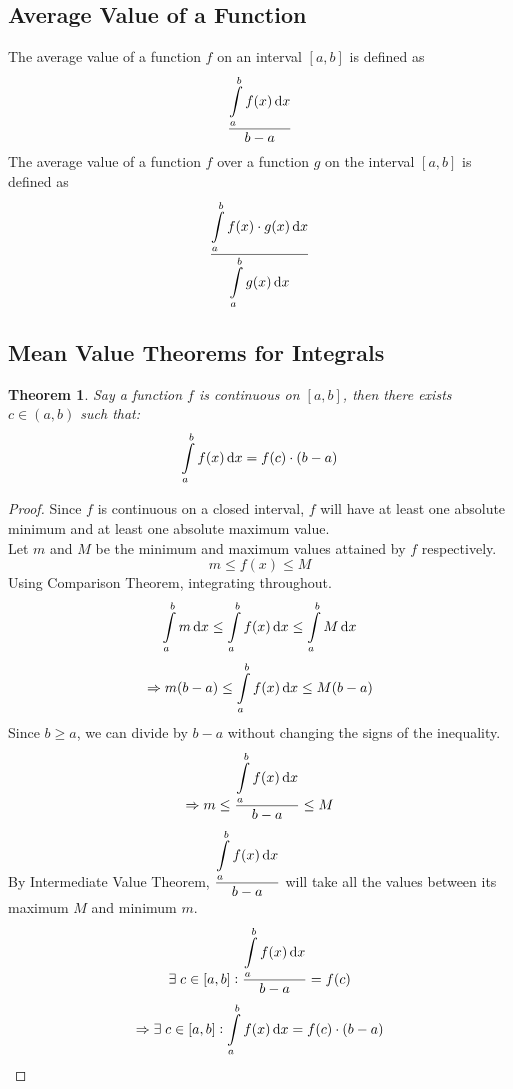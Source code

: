 \documentclass[14]{article}
\newtheorem{theorem}{Theorem}
\theoremstyle{definition}
\theoremstyle{case}
\begin{document}
\subsection{Average Value of a Function}
The average value of a function $f$ on an interval $[a, b]$ is defined as
\[\dfrac{\displaystyle\int\limits_a^b f(x) \dif x}{b-a}\]
The average value of a function $f$ over a function $g$ on the interval $[a, b]$ is defined as
\[\dfrac{\displaystyle\int\limits_a^b f(x)\cdot g(x) \dif x}{\displaystyle \int\limits_a^b g(x) \dif x}\]
\pagebreak
\subsection{Mean Value Theorems for Integrals}
\begin{theorem}
Say a function $f$ is continuous on $[a, b]$, then there exists $c \in (a, b)$ such that:
\[\int\limits_a^b f(x) \dif x = f(c) \cdot (b-a)\]
\end{theorem}
\begin{proof}
Since $f$ is continuous on a closed interval, $f$ will have at least one absolute minimum and at least one absolute maximum value.\\
Let $m$ and $M$ be the minimum and maximum values attained by $f$ respectively.
\[m \leq f(x) \leq M\]
Using Comparison Theorem, integrating throughout.
\[\int\limits_a^b m \dif x \leq \int\limits_a^b f(x) \dif x \leq \int\limits_a^b M \dif x\]
\[\Rightarrow m(b-a) \leq \int\limits_a^b f(x) \dif x \leq M(b-a)\]
Since $b \geq a$, we can divide by $b-a$ without changing the signs of the inequality.
\[\Rightarrow m \leq \dfrac{\displaystyle\int\limits_a^b f(x)\dif x}{b-a} \leq M\]
By Intermediate Value Theorem, $\dfrac{\displaystyle\int\limits_a^b f(x)\dif x}{b-a}$ will take all the values between its maximum $M$ and minimum $m$.
\[\exists\; c \in [a, b] : \dfrac{\displaystyle\int\limits_a^b f(x)\dif x}{b-a} = f(c)\]
\[\Rightarrow \exists\; c \in [a, b] : \int\limits_a^b f(x)\dif x = f(c) \cdot (b-a)\]
\end{proof}
\pagebreak
\end{document}
